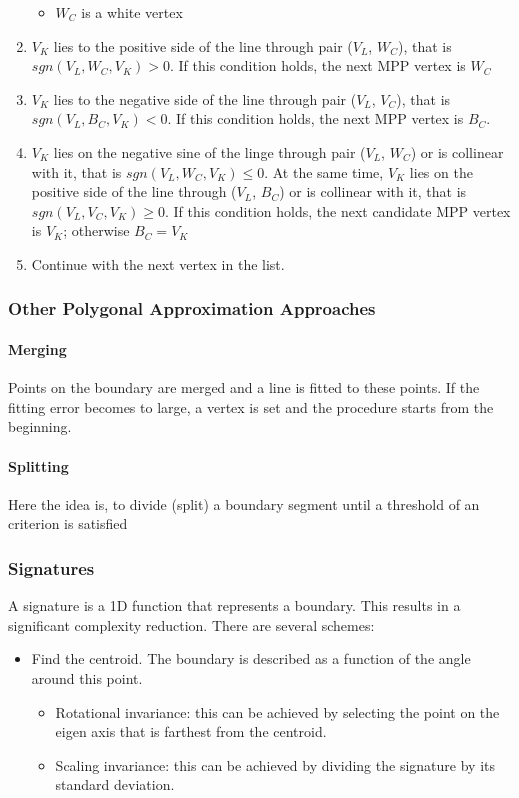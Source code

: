 \begin{enumerate}
\begin{itemize}
\item $W_C$ is a white vertex
\end{itemize} 
\item $V_K$ lies to the positive side of the line through pair ($V_L$, $W_C$), that is $sgn(V_L, W_C, V_K)>0$. If this condition holds, the next MPP vertex is $W_C$
\item $V_K$ lies to the negative side of the line through pair ($V_L$, $V_C$), that is $sgn(V_L, B_C, V_K)<0$. If this condition holds, the next MPP vertex is $B_C$.
\item $V_K$ lies on the negative sine of the linge through pair ($V_L$, $W_C$) or is collinear with it, that is $sgn(V_L, W_C, V_K) \le 0$. At the same time, $V_K$ lies on the positive side of the line through ($V_L$, $B_C$) or is collinear with it, that is $sgn(V_L, V_C, V_K) \ge 0$. If this condition holds, the next candidate MPP vertex is $V_K$; otherwise $B_C = V_K$
\item Continue with the next vertex in the list.
\end{enumerate}
\subsubsection{Other Polygonal Approximation Approaches}
\paragraph{Merging}
Points on the boundary are merged and a line is fitted to these points. If the fitting error becomes to large, a vertex is set and the procedure starts from the beginning.\\
\paragraph{Splitting}
Here the idea is, to divide (split) a boundary segment until a threshold of an criterion is satisfied
\subsubsection{Signatures}
A signature is a 1D function that represents a boundary. This results in a significant complexity reduction. There are several schemes:\\
\begin{itemize}
\item Find the centroid. The boundary is described as a function of the angle around this point.
\begin{itemize}
\item Rotational invariance: this can be achieved by selecting the point on the eigen axis that is farthest from the centroid.
\item Scaling invariance: this can be achieved by dividing the signature by its standard deviation.
\end{itemize}
\end{itemize}
